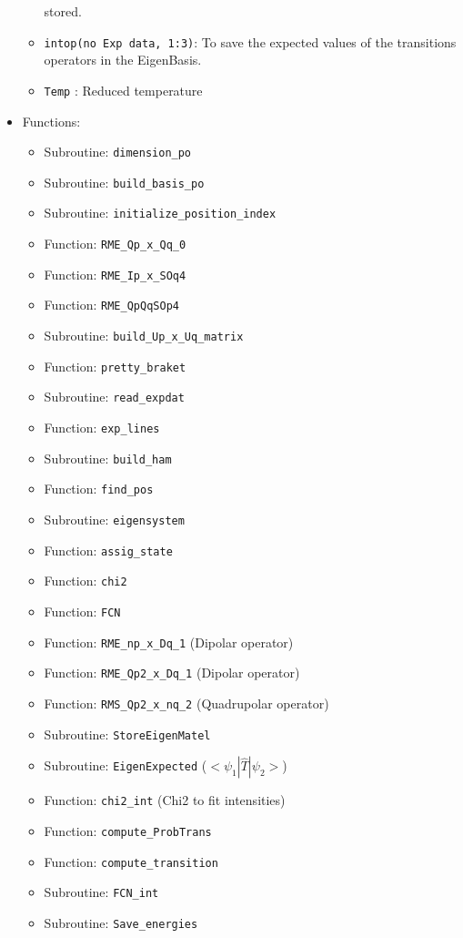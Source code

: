 \documentclass[english,twoside, openright]{report}
\begin{document}
\begin{itemize}
\begin{itemize}
    stored.
  \item \texttt{intop(no Exp data, 1:3)}: To save the expected values
    of the transitions operators in the EigenBasis.
  \item \texttt{Temp} : Reduced temperature
  \end{itemize}
\item Functions:
  \begin{itemize}
  \item Subroutine: \texttt{dimension\_po}
  \item Subroutine: \texttt{build\_basis\_po}
  \item Subroutine: \texttt{initialize\_position\_index}
  \item Function: \texttt{RME\_Qp\_x\_Qq\_0}
  \item Function: \texttt{RME\_Ip\_x\_SOq4}
  \item Function: \texttt{RME\_QpQqSOp4}
  \item Subroutine: \texttt{build\_Up\_x\_Uq\_matrix}
  \item Function: \texttt{pretty\_braket}
  \item Subroutine: \texttt{read\_expdat}
  \item Function: \texttt{exp\_lines}
  \item Subroutine: \texttt{build\_ham}
  \item Function: \texttt{find\_pos}
  \item Subroutine: \texttt{eigensystem}
  \item Function: \texttt{assig\_state}
  \item Function: \texttt{chi2}
  \item Function: \texttt{FCN}
  \item Function: \texttt{RME\_np\_x\_Dq\_1} (Dipolar operator)
  \item Function: \texttt{RME\_Qp2\_x\_Dq\_1} (Dipolar operator)
  \item Function: \texttt{RMS\_Qp2\_x\_nq\_2} (Quadrupolar operator)
  \item Subroutine: \texttt{StoreEigenMatel}
  \item Subroutine: \texttt{EigenExpected} ($<\psi_1| \hat T | \psi_2 >$)
  \item Function: \texttt{chi2\_int} (Chi2 to fit intensities)
  \item Function: \texttt{compute\_ProbTrans}
  \item Function: \texttt{compute\_transition}
  \item Subroutine: \texttt{FCN\_int}
  \item Subroutine: \texttt{Save\_energies}
  \end{itemize}
\end{itemize}
\end{document}
